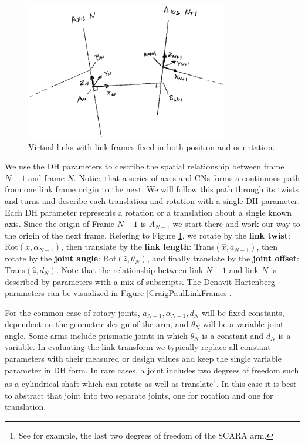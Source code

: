\begin{figure}\centering
\includegraphics[width=3.5in]{figs03/00340.eps}
\caption{Virtual links with link frames fixed in both position and orientation.}\label{VirtualLinkswFrames}
\end{figure}

We use the DH parameters to describe the spatial relationship between frame $N-1$ and frame $N$.    Notice that a series of axes and CNs forms a continuous path from one link frame origin to the next.    We will follow this path through its twists and turns and describe each translation and rotation with a single DH parameter.  Each DH parameter represents a rotation or a translation about a single known axis.   Since the origin of Frame $N-1$ is $A_{N-1}$ we start there  and work our way to the origin of the next frame.   Refering to Figure \ref{VirtualLinkswFrames}, we rotate by the {\bf link twist}:  $\mathrm{Rot}(\hat{x},\alpha_{N-1})$, then translate by the {\bf link length}: Trans$(\hat{x},a_{N-1})$, then rotate by the {\bf joint angle}: Rot$(\hat{z}, \theta_N)$, and finally translate by the {\bf joint offset}: Trans$(\hat{z}, d_N)$.   Note that the relationship between link $N-1$ and link $N$ is described by parameters with a mix of subscripts.   The Denavit Hartenberg parameters can be visualized in
Figure \ref{CraigPaulLinkFrames}.

For the common case of rotary joints,  $a_{N-1}, \alpha_{N-1}, d_N$ will be fixed constants, dependent on the geometric design of the arm, and $\theta_N$ will be a variable joint angle.   Some arms include prismatic joints in which $\theta_N$ is a constant and $d_N$ is a variable.   In evaluating the link transform we typically replace all constant parameters with their measured or design values and keep the single variable parameter in DH form.     In rare cases, a joint includes two degrees of freedom such as a cylindrical shaft which can rotate as well as translate\footnote{See for example, the last two degrees of freedom of the SCARA arm.}.   In this case it is best to abstract that joint into two separate joints, one for rotation and one for translation.

